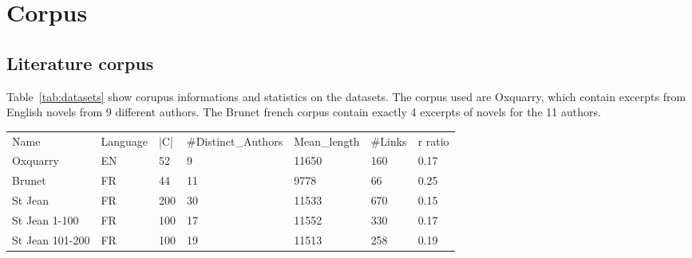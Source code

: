 \section{Corpus}

\subsection{Literature corpus}

Table~\ref{tab:datasets} show corupus informations and statistics on the datasets.
The corpus used are Oxquarry, which contain excerpts from English novels from 9 different authors.
The Brunet french corpus contain exactly 4 excerpts of novels for the 11 authors.

\begin{table*}[t]
  \caption{General information on the datasets}
  \label{tab:datasets}
  \begin{tabular}{|l|l|l|l|l|l|l|}
    Name & Language & |C| & \#Distinct\_Authors & Mean\_length & \#Links & r ratio \\
    Oxquarry & EN & 52 & 9 & 11650 & 160 & 0.17\\
    Brunet & FR & 44 & 11 & 9778 & 66 & 0.25\\
    St Jean & FR & 200 & 30 & 11533 & 670 & 0.15\\
    St Jean 1-100 & FR & 100 & 17 & 11552 & 330 & 0.17\\
    St Jean 101-200 & FR & 100 & 19 & 11513 & 258 & 0.19 \\
  \end{tabular}
\end{table*}


\subsection{}
